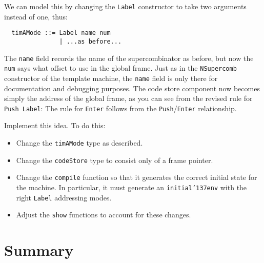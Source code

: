 We can model this by changing the \mbox{\tt Label} constructor to take two arguments
instead of one, thus:
\begin{verbatim}
  timAMode ::= Label name num
               | ...as before...
\end{verbatim}
The \mbox{\tt name} field records the name of the supercombinator as before, but
now the \mbox{\tt num} says what offset to use in the global frame.
Just as in the \mbox{\tt NSupercomb} constructor of the template machine, the
\mbox{\tt name} field is only there for documentation and debugging purposes.
The code store component now becomes simply the address of the
global frame, as you can see from the
revised rule for \mbox{\tt Push\ Label}:
The rule for \mbox{\tt Enter} follows from the \mbox{\tt Push}/\mbox{\tt Enter} relationship.
\begin{exercise}
Implement this idea.  To do this:
\begin{itemize}
\item
Change the \mbox{\tt timAMode} type as described.
\item
Change the \mbox{\tt codeStore} type to consist only of a frame pointer.
\item
Change the \mbox{\tt compile} function so that it generates the correct
initial state for the machine.
In particular, it must generate
an \mbox{\tt initial{\char'137}env} with the right \mbox{\tt Label} addressing
modes.
\item
Adjust the \mbox{\tt show} functions to account for these changes.
\end{itemize}
\end{exercise}

\section{Summary}

